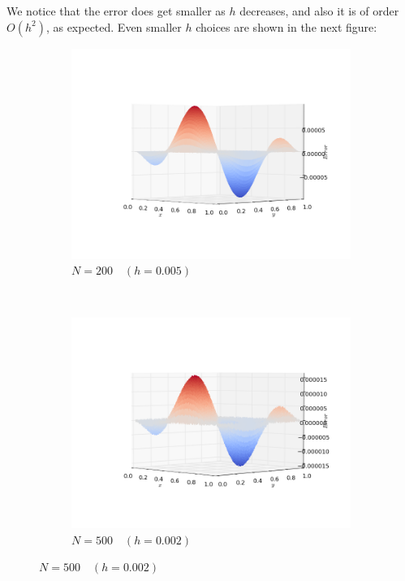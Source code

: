 \documentclass[11pt]{report}
\begin{document}
We notice that the error does get smaller as $h$ decreases, and also it is of order $O(h^2)$, as expected. Even smaller $h$ choices are shown in the next figure:

\begin{figure}[h!]
\centering
\begin{subfigure}{0.5\textwidth}
  \centering
  \includegraphics[width=1.0\linewidth]{images/example4_200}
  \caption{$N = 200 \quad (h = 0.005)$}
\end{subfigure}\\
\begin{subfigure}{0.5\textwidth}
  \centering
  \includegraphics[width=1.0\linewidth]{images/example4_500}
  \caption{$N = 500 \quad (h = 0.002)$}

\end{subfigure}
\end{figure}
\end{document}

